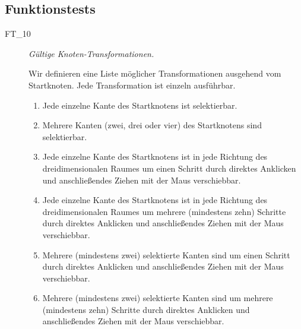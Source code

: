 %



\newpage



\subsection*{Funktionstests}
\label{Abschnitt:Tests:Protokoll:Funktion}



\begin{description}
	
% 
	
	\item[FT\_10] \textit{Gültige Knoten-Transformationen.} \hfill\\
	
	\label{FT:10}
	
	Wir definieren eine Liste möglicher Transformationen ausgehend vom Startknoten. Jede Transformation ist einzeln ausführbar.\\

	\begin{enumerate}
	
		\item Jede einzelne Kante des Startknotens ist selektierbar.
		\item Mehrere Kanten (zwei, drei oder vier) des Startknotens sind selektierbar.
			
		\item Jede einzelne Kante des Startknotens ist in jede Richtung des dreidimensionalen Raumes um einen Schritt durch direktes Anklicken und anschließendes Ziehen mit der Maus verschiebbar.
		\item Jede einzelne Kante des Startknotens ist in jede Richtung des dreidimensionalen Raumes um mehrere (mindestens zehn) Schritte durch direktes Anklicken und anschließendes Ziehen mit der Maus verschiebbar.
		\item Mehrere (mindestens zwei) selektierte Kanten sind um einen Schritt durch direktes Anklicken und anschließendes Ziehen mit der Maus verschiebbar.
		\item Mehrere (mindestens zwei) selektierte Kanten sind um mehrere (mindestens zehn) Schritte durch direktes Anklicken und anschließendes Ziehen mit der Maus verschiebbar.
		

\end{enumerate}
\end{description}
